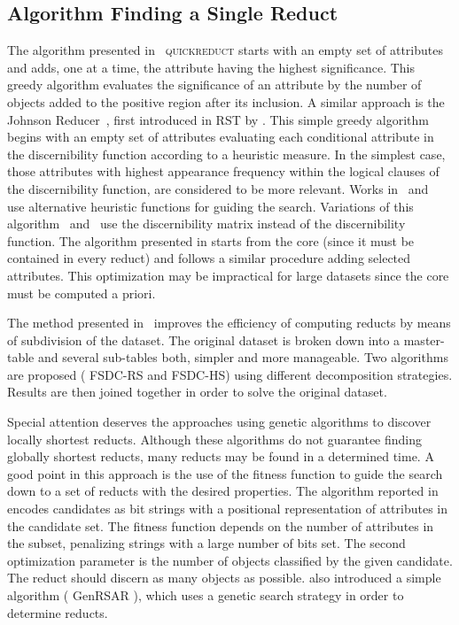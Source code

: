 \documentclass[authoryear,11pt]{elsarticle}
\makeatletter
\newcommand{\setword}[2]{%
  \phantomsection
  #1\def\@currentlabel{\unexpanded{#1}}\label{#2}%
}
\makeatother
\begin{document}
\subsection{Algorithm Finding a Single Reduct}
  The algorithm presented in~\citep{Chouchoulas01} \setword{\textsc{quickreduct}}{quickreduct} starts with 
  an empty set of attributes and adds, one at a time, the attribute having the highest significance. 
  This greedy algorithm evaluates the significance of an attribute by the number of objects added to 
  the positive region after its inclusion.  
  A similar approach is the Johnson Reducer~\citep{Johnson74}, first introduced in RST by \cite{Ohrn00}.
  This simple greedy algorithm begins with an empty set of attributes evaluating each conditional attribute in the
  discernibility function according to a heuristic measure. In the simplest case, those attributes with highest 
  appearance frequency within the logical clauses of the discernibility function, are considered to be more
  relevant. Works in~\citep{Nguyen97} and~\citep{Wang01} use alternative heuristic functions for guiding the
  search. 
  Variations of this algorithm~\citep{Wang01} and~\citep{Yang08} use the discernibility matrix instead of the
  discernibility function.
  The algorithm presented in \citep{Zhong01} starts from the core (since it must be contained in every reduct) and
  follows a similar procedure adding selected attributes. This optimization may be impractical for large datasets
  \citep{Jensen14} since the core must be computed a priori.
  
  The method presented in~\citep{Jiao10} improves the efficiency of computing reducts by means of subdivision 
  of the dataset. The original dataset is broken down into a master-table and several sub-tables both, simpler
  and more manageable. Two algorithms are proposed (\setword{FSDC-RS}{FSDCRS} and FSDC-HS) using 
  different decomposition strategies. Results are then joined together in order to solve the original dataset. 
    
  Special attention deserves the approaches using genetic algorithms to discover locally shortest reducts. Although 
  these algorithms do not guarantee finding globally shortest reducts, many reducts may be found in a determined
  time. A good point in this approach is the use of the fitness function to guide the search down to a set of 
  reducts with the desired properties. The algorithm reported in~\citep{Wroblewski95} encodes candidates as bit 
  strings with a positional representation of attributes in the candidate set. The fitness function
  depends on the number of attributes in the subset, penalizing strings with a large number of bits set. The 
  second optimization parameter is the number of objects classified by the given candidate. The reduct should 
  discern as many objects as possible. \cite{Jensen03} also introduced a simple algorithm 
  (\setword{GenRSAR}{GenRSAR}), which uses a genetic search strategy in order to determine reducts.
  
\end{document}
